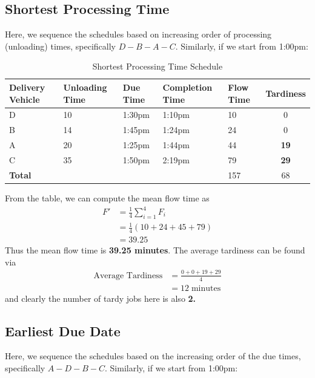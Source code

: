 \documentclass[12pt]{article}
\begin{document}
\subsection*{Shortest Processing Time}

Here, we sequence the schedules based on increasing order of processing (unloading) times, specifically $D-B-A-C$. Similarly, if we start from 1:00pm:

\begin{table}[H]
    \centering
    \begin{tabular}{p{1.8cm} p{3cm} p{1.8cm} p{3cm} p{1.8cm} c} \toprule
        \textbf{Delivery Vehicle} & \textbf{Unloading Time} & \textbf{Due Time} & \textbf{Completion Time} & \textbf{Flow Time} & \textbf{Tardiness} \\ \midrule 
        D & 10 & 1:30pm & 1:10pm & 10 & 0 \\ 
        B & 14 & 1:45pm & 1:24pm & 24 & 0 \\ 
        A & 20 & 1:25pm & 1:44pm & 44 & \textbf{19} \\ 
        C & 35 & 1:50pm & 2:19pm & 79 & \textbf{29} \\ \midrule
        \textbf{Total} & & & & 157 & 68 \\ \bottomrule
    \end{tabular}
    \caption{Shortest Processing Time Schedule}
    \label{tab:4-SPT}
\end{table}

\noindent From the table, we can compute the mean flow time as \begin{align*}
    F' &= \frac{1}{4} \sum_{i=1}^{4} F_i \\ 
    &= \frac{1}{4} \left( 10 + 24 + 45 + 79 \right) \\ 
    &= 39.25
\end{align*} Thus the mean flow time is \textbf{39.25 minutes}. The average tardiness can be found via \begin{align*}
    \text{Average Tardiness} &= \frac{0 + 0 + 19 + 29}{4} \\ 
    &= 12\; \text{minutes}
\end{align*} and clearly the number of tardy jobs here is also \textbf{2.} 

\subsection*{Earliest Due Date}

Here, we sequence the schedules based on the increasing order of the due times, specifically $A-D-B-C$. Similarly, if we start from 1:00pm:
\end{document}
